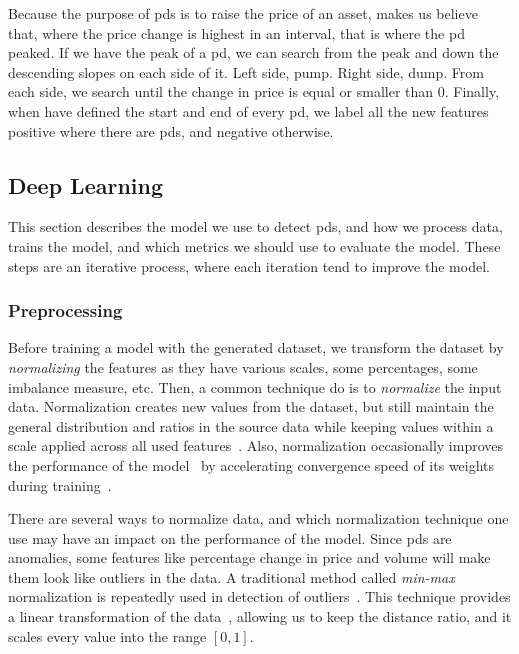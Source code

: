 Because the purpose of \acp{pd} is to raise the price of an asset, makes us believe that, where the price change is highest in an interval, that is where the \ac{pd} peaked. If we have the peak of a \ac{pd}, we can search from the peak and down the descending slopes on each side of it. Left side, pump. Right side, dump. From each side, we search until the change in price is equal or smaller than $0$. Finally, when have defined the start and end of every \ac{pd}, we label all the new features positive where there are \acp{pd}, and negative otherwise.

\subsection{Deep Learning}
This section describes the model we use to detect \acp{pd}, and how we process data, trains the model, and which metrics we should use to evaluate the model. These steps are an iterative process, where each iteration tend to improve the model.

\subsubsection{Preprocessing}
Before training a model with the generated dataset, we transform the dataset by \emph{normalizing} the features as they have various scales, some percentages, some imbalance measure, etc. Then, a common technique do is to \emph{normalize} the input data. Normalization creates new values from the dataset, but still maintain the general distribution and ratios in the source data while keeping values within a scale applied across all used features~\cite{normalize_data}. Also, normalization occasionally improves the performance of the model~\cite{normalize_google} by accelerating convergence speed of its weights during training~\cite{sola1997importance}.

There are several ways to normalize data, and which normalization technique one use may have an impact on the performance of the model. Since \acp{pd} are anomalies, some features like percentage change in price and volume will make them look like outliers in the data. A traditional method called \emph{min-max} normalization is repeatedly used in detection of outliers~\cite{campos2016evaluation, goldstein2016comparative}. This technique provides a linear transformation of the data~\cite{panda2014smoothing}, allowing us to keep the distance ratio, and it scales every value into the range $[0,1]$.

